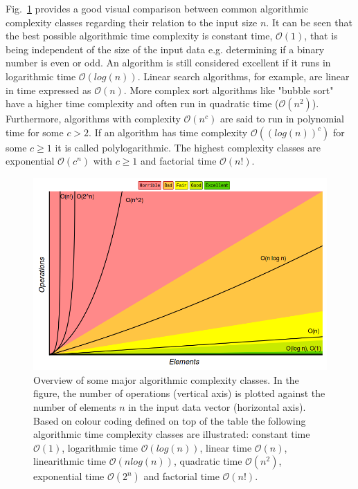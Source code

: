 Fig.~\ref{fig:algcomplexities} provides a good visual comparison between common algorithmic complexity classes regarding their relation to the input size $n$. It can be seen that the best possible algorithmic time complexity is constant time, $\mathcal{O}(1)$, that is being independent of the size of the input data e.g. determining if a binary number is even or odd. An algorithm is still considered excellent if it runs in logarithmic time $\mathcal{O}(log(n))$. Linear search algorithms, for example, are linear in time expressed as $\mathcal{O}(n)$. More complex sort algorithms like "bubble sort" have a higher time complexity and often run in quadratic time ($\mathcal{O}(n^2)$). Furthermore, algorithms with complexity $\mathcal{O}(n^c)$ are said to run in polynomial time for some $c > 2$. If an algorithm has time complexity $\mathcal{O}((log(n))^c)$ for some $c \geq 1$ it is called polylogarithmic. The highest complexity classes are exponential $\mathcal{O}(c^n)$ with $c \geq 1$ and factorial time $\mathcal{O}(n!)$. 

\begin{figure}[H]
      \centering
       \includegraphics[scale=0.35]{img/bigocomplexity.png}
       \caption[]{\label{fig:algcomplexities} Overview of some major algorithmic complexity classes. In the figure, the number of operations (vertical axis) is plotted against the number of elements $n$ in the input data vector (horizontal axis). Based on colour coding defined on top of the table the following algorithmic time complexity classes are illustrated: constant time $\mathcal{O}(1)$, logarithmic time $\mathcal{O}(log(n))$, linear time $\mathcal{O}(n)$, linearithmic time $\mathcal{O}(n log(n))$, quadratic time $\mathcal{O}(n^2)$, exponential time $\mathcal{O}(2^n)$ and factorial time $\mathcal{O}(n!)$.\footnotemark[6]}
\end{figure}

